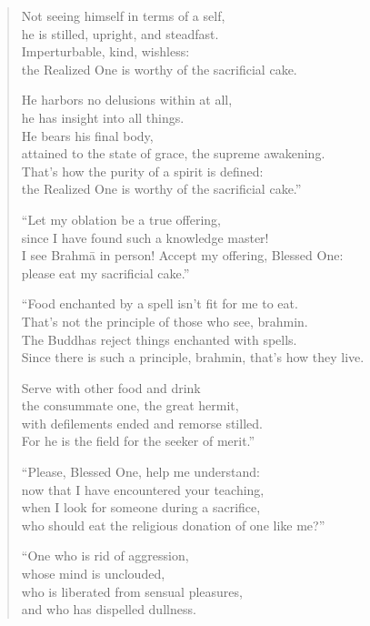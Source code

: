 \documentclass[12pt,openany]{book}%
\begin{document}
\begin{verse}
Not seeing himself in terms of a self, \\
he is stilled, upright, and steadfast. \\
Imperturbable, kind, wishless: \\
the Realized One is worthy of the sacrificial cake. 

He harbors no delusions within at all, \\
he has insight into all things. \\
He bears his final body, \\
attained to the state of grace, the supreme awakening. \\
That’s how the purity of a spirit is defined: \\
the Realized One is worthy of the sacrificial cake.” 

“Let my oblation be a true offering, \\
since I have found such a knowledge master! \\
I see \textsanskrit{Brahmā} in person! Accept my offering, Blessed One: \\
please eat my sacrificial cake.” 

“Food enchanted by a spell isn’t fit for me to eat. \\
That’s not the principle of those who see, brahmin. \\
The Buddhas reject things enchanted with spells. \\
Since there is such a principle, brahmin, that’s how they live. 

Serve with other food and drink \\
the consummate one, the great hermit, \\
with defilements ended and remorse stilled. \\
For he is the field for the seeker of merit.” 

“Please, Blessed One, help me understand: \\
now that I have encountered your teaching, \\
when I look for someone during a sacrifice, \\
who should eat the religious donation of one like me?” 

“One who is rid of aggression, \\
whose mind is unclouded, \\
who is liberated from sensual pleasures, \\
and who has dispelled dullness. 


\end{verse}
\end{document}
